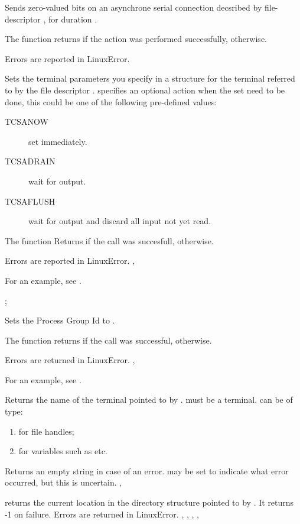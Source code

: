 {  
  Sends zero-valued bits on an asynchrone serial connection decsribed by
  file-descriptor , for duration .

  The function returns  if the action was performed successfully,
 otherwise.
}
{Errors are reported in LinuxError.}
{}

{ 
  Sets the terminal parameters you specify in a  structure
 for the terminal
  referred to by the file descriptor .  specifies an 
  optional action when the set need to be done,
  this could be one of the following pre-defined values:
 \begin{description}
\item [TCSANOW\ ] set immediately.
\item [TCSADRAIN\ ] wait for output.
\item [TCSAFLUSH\ ] wait for output and discard all input not yet read. 
\end{description}
The function Returns  if the call was succesfull,  
otherwise.
}
{Errors are reported in LinuxError.}
{, }

For an example, see .

;
{  Sets the Process Group Id to . 

The function returns  if the call was successful, 
otherwise.
}
{Errors are returned in LinuxError.}
{, }

For an example, see .

{
Returns the name of the terminal pointed to by . 
must be a terminal.  can be of type:
\begin{enumerate}
\item {} for file handles;
\item {} for  variables such as  etc.
\end{enumerate}
}
{ Returns an empty string in case of an error.  may be set
 to indicate what error occurred, but this is uncertain.}
{,}


{  returns the current location in the directory structure
pointed to by . It returns -1 on failure.}
{Errors are returned in LinuxError.}
{, , , ,
}

